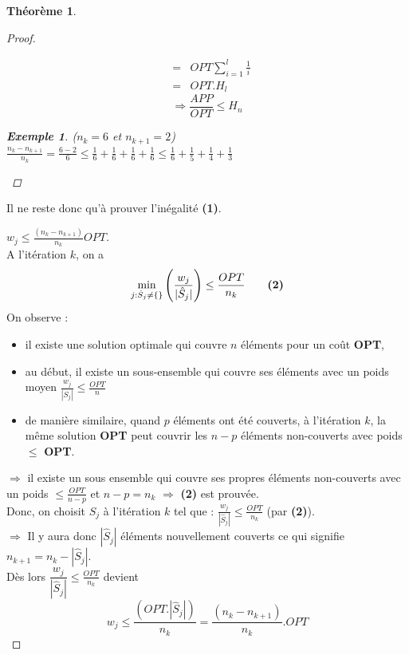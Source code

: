 \documentclass{article}
\newtheorem{exemple}{Exemple}[section]
\newtheorem{thm}{Th\'eor\`eme}[section]
\newtheorem{proof}{Preuve}[section]
\begin{document}
\begin{sffamily}
\begin{thm}
\begin{proof}
\begin{itemize}
$$\begin{eqnarray}
	& = & OPT \sum_{i=1}^l \frac{1}{i} \\
	& = & OPT.H_l
\end{eqnarray}$$ $$\Rightarrow \frac{APP}{OPT} \leq H_n$$
\begin{exemple}($n_k=6$ et $n_{k+1}=2$) \\
$\frac{n_k - n_{k+1}}{n_k}=\frac{6-2} 6 \leq \frac 1 6 +\frac 1 6 +\frac 1 6 +\frac 1 6 \leq \frac 1 6 +\frac 1 5 +\frac 1 4 +\frac 1 3$
\end{exemple}
\end{itemize}
\end{proof}
\end{thm}

Il ne reste donc qu'à prouver l'inégalité \textbf{(1)}. \\

\newpage

\begin{proof}[$w_j \leq \frac{(n_k - n_{k+1})}{n_k}OPT$]$ $\\
A l'itération $k$, on a 
$$ \min_{j:\hat{S}_j \neq \{\}} \left(\frac{w_j}{|\hat{S}_j|}\right) \leq \frac{OPT}{n_k}\qquad \text{\textbf{(2)}}$$
On observe :
\begin{itemize}
\item il existe une solution optimale qui couvre $n$ éléments pour un coût \textbf{OPT},
\item au début, il existe un sous-ensemble qui couvre ses éléments avec un poids moyen $\frac{w_j}{|S_j|} \leq \frac{OPT}{n}$
\item de manière similaire, quand $p$ éléments ont été couverts, à l'itération $k$, la même solution \textbf{OPT} peut couvrir les
$n-p$ éléments non-couverts avec poids $\leq$ \textbf{OPT}.
\end{itemize}
$\Rightarrow$ il existe un sous ensemble qui couvre ses propres éléments non-couverts avec un poids $\leq \frac{OPT}{n-p}$ et $n-p = 
n_k$ $\Rightarrow$ \textbf{(2)} est prouvée. \\

\noindent Donc, on choisit $S_j$ à l'itération $k$ tel que : $\frac{w_j}{|\hat{S}_j|} \leq \frac{OPT}{n_k}$ (par \textbf{(2)}).\\
$\Longrightarrow$ Il y aura donc $|\hat{S}_j|$ éléments nouvellement couverts ce qui signifie $n_{k+1} = n_k-|\hat{S}_j| $. \\
Dès lors $\dfrac{w_j}{|\hat{S}_j|} \leq \frac{OPT}{n_k}$ devient 
$$w_j \leq \frac{(OPT.|\hat{S}_j|)}{n_k} = \frac{(n_k-n_{k+1})}{n_k}.OPT$$


\end{proof}
\end{sffamily}
\end{document}
